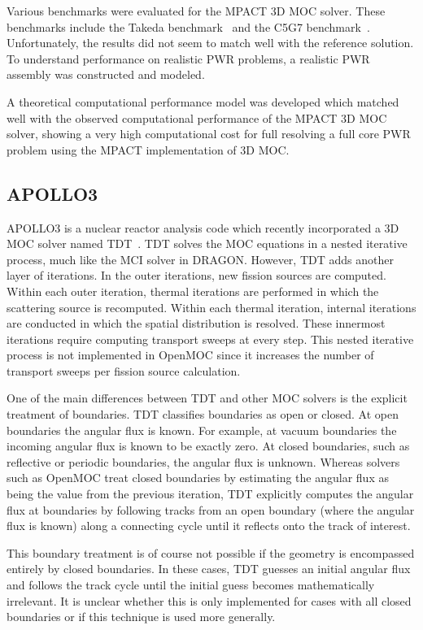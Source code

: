 Various benchmarks were evaluated for the MPACT 3D \ac{MOC} solver. These benchmarks include the Takeda benchmark~\cite{takeda} and the C5G7 benchmark~\cite{c5g7}. Unfortunately, the results did not seem to match well with the reference solution. To understand performance on realistic \ac{PWR} problems, a realistic \ac{PWR} assembly was constructed and modeled. 

A theoretical computational performance model was developed which matched well with the observed computational performance of the MPACT 3D \ac{MOC} solver, showing a very high computational cost for full resolving a full core \ac{PWR} problem using the MPACT implementation of 3D \ac{MOC}.

\subsection{APOLLO3}
\label{sec:apollo3}

APOLLO3 is a nuclear reactor analysis code which recently incorporated a 3D \ac{MOC} solver named TDT~\cite{Sciannandrone2016}. TDT solves the \ac{MOC} equations in a nested iterative process, much like the MCI solver in DRAGON. However, TDT adds another layer of iterations. In the outer iterations, new fission sources are computed. Within each outer iteration, thermal iterations are performed in which the scattering source is recomputed. Within each thermal iteration, internal iterations are conducted in which the spatial distribution is resolved. These innermost iterations require computing transport sweeps at every step. This nested iterative process is not implemented in OpenMOC since it increases the number of transport sweeps per fission source calculation. 

One of the main differences between TDT and other \ac{MOC} solvers is the explicit treatment of boundaries. TDT classifies boundaries as open or closed. At open boundaries the angular flux is known. For example, at vacuum boundaries the incoming angular flux is known to be exactly zero. At closed boundaries, such as reflective or periodic boundaries, the angular flux is unknown. Whereas solvers such as OpenMOC treat closed boundaries by estimating the angular flux as being the value from the previous iteration, TDT explicitly computes the angular flux at boundaries by following tracks from an open boundary (where the angular flux is known) along a connecting cycle until it reflects onto the track of interest.

This boundary treatment is of course not possible if the geometry is encompassed entirely by closed boundaries. In these cases, TDT guesses an initial angular flux and follows the track cycle until the initial guess becomes mathematically irrelevant. It is unclear whether this is only implemented for cases with all closed boundaries or if this technique is used more generally.

